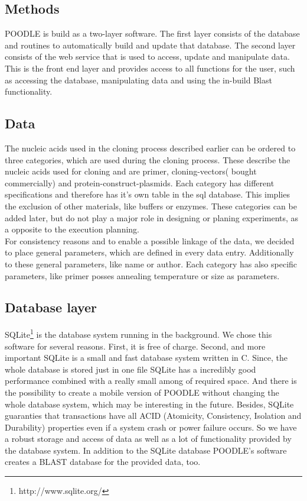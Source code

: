 \documentclass{bioinfo}
\begin{document}
\begin{methods}
\section{Methods}

POODLE is build as a two-layer software. The first layer consists of the database and routines to 
automatically build and update that database. The second layer consists of the web service that is 
used to access, update and manipulate data. This is the front end layer and provides access to all 
functions for the user, such as accessing the database, manipulating data and using the in-build 
Blast functionality.

\subsection{Data}
The nucleic acids used in the cloning process described earlier can be ordered to  three categories, which are used during the cloning process. These describe the nucleic acids used for cloning and are primer, cloning-vectors( bought commercially) and protein-construct-plasmids. Each category has different specifications and therefore has it's own table in the sql database. This implies the exclusion of other materials, like buffers or enzymes. These categories can be added later, but do not play a major role in designing or planing experiments, as a opposite to the execution planning.\\
For consistency reasons and to enable a possible linkage of the data, we decided to place general parameters, which are defined in every data entry. Additionally to these general parameters, like name or author. Each category has also specific parameters, like primer posses annealing temperature or size as parameters.


\subsection{Database layer}

SQLite\footnote{http://www.sqlite.org/} is the database system running in the background. We chose 
this software for several reasons. First, it is free of charge. Second, and more important SQLite is 
a small and fast database system written in C. Since, the whole database is stored just in one file
SQLite has a incredibly good performance combined with a really small among of required space. And there 
is the possibility to create a mobile version of POODLE without changing the whole database system, 
which may be interesting in the future. Besides, 
SQLite guaranties that transactions have all ACID (Atomicity, Consistency, Isolation and Durability) properties even if a system crash or power failure occurs. So 
we have a robust storage and access of data as well as a lot of functionality provided by the database 
system. In addition to the SQLite database POODLE's software creates a BLAST database for the provided 
data, too. 


\end{methods}
\end{document}
